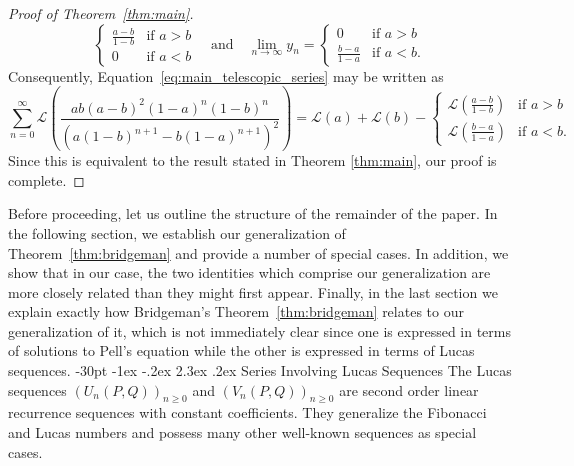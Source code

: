 \documentclass[10pt]{article}
\makeatletter
\renewcommand\section{\@startsection {section}{1}{\z@}
{-30pt \@plus -1ex \@minus -.2ex}
{2.3ex \@plus.2ex}
{\normalfont\normalsize\bfseries\boldmath}}
\theoremstyle{definition}
\makeatother
\begin{document}
\begin{proof}[Proof of Theorem~\ref{thm:main}]
\begin{equation*}
\begin{cases}
        \frac{a-b}{1-b} & \text{if } a > b \\
        0 & \text{if } a < b
        \end{cases} \quad \text{and} \quad \lim_{n\to\infty}y_n = \begin{cases}
        0 & \text{if } a > b \\
        \frac{b-a}{1-a} & \text{if } a < b.
        \end{cases}
\end{equation*}
Consequently, Equation~\eqref{eq:main_telescopic_series} may be written as
    \begin{equation*}
     \sum_{n=0}^{\infty}\mathcal{L}\left(\frac{ab(a-b)^2(1-a)^n(1-b)^n}{(a(1-b)^{n+1}-b(1-a)^{n+1})^2}\right) = \mathcal{L}(a) + \mathcal{L}(b) - \begin{cases}
         \mathcal{L}\left(\frac{a-b}{1-b}\right) & \text{if } a > b \\
         \mathcal{L}\left(\frac{b-a}{1-a}\right) & \text{if } a < b.
     \end{cases}
     \end{equation*}
     Since this is equivalent to the result stated in Theorem \ref{thm:main}, our proof is complete.
\end{proof}
Before proceeding, let us outline the structure of the remainder of the paper.  In the following section, we establish our generalization of Theorem~\ref{thm:bridgeman} and provide a number of special cases.  In addition, we show that in our case, the two identities which comprise our generalization are more closely related than they might first appear.  Finally, in the last section we explain exactly how Bridgeman's Theorem~\ref{thm:bridgeman} relates to our generalization of it, which is not immediately clear since one is expressed in terms of solutions to Pell's equation while the other is expressed in terms of Lucas sequences.
\section{Series Involving Lucas Sequences}
The Lucas sequences $(U_n(P,Q))_{n\geq 0}$ and $(V_n(P,Q))_{n\geq 0}$ are second order linear recurrence sequences with constant coefficients.  They generalize the Fibonacci and Lucas numbers and possess many other well-known sequences as special cases.
\end{document}
